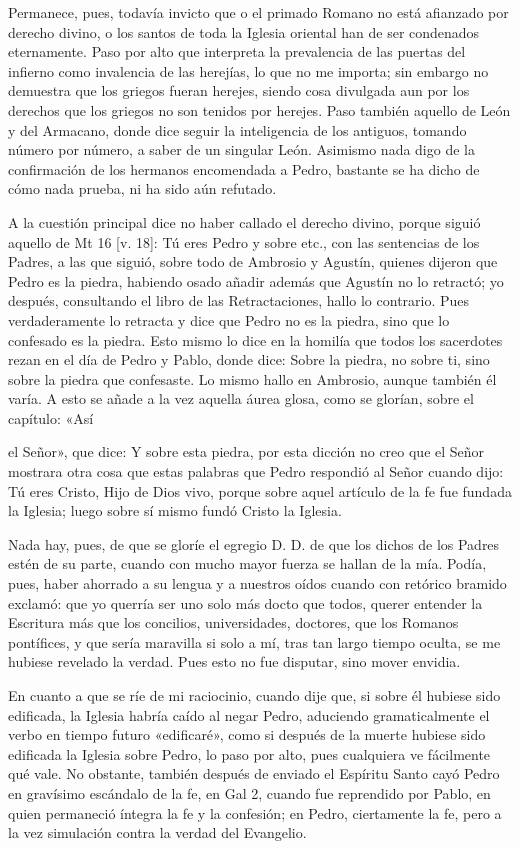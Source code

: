 Permanece, pues, todavía invicto que o el primado Romano no está afianzado por derecho divino, o los santos de toda la Iglesia oriental han de ser condenados eternamente. Paso por alto que interpreta la prevalencia de las puertas del infierno como invalencia de las herejías, lo que no me importa; sin embargo no demuestra que los griegos fueran herejes, siendo cosa divulgada aun por los derechos que los griegos no son tenidos por herejes. Paso también aquello de León y del Armacano, donde dice seguir la inteligencia de los antiguos, tomando número por número, a saber de un singular León. Asimismo nada digo de la confirmación de los hermanos encomendada a Pedro, bastante se ha dicho de cómo nada prueba, ni ha sido aún refutado.

A la cuestión principal dice no haber callado el derecho divino, porque siguió aquello de Mt 16 [v. 18]: Tú eres Pedro y sobre etc., con las sentencias de los Padres, a las que siguió, sobre todo de Ambrosio y Agustín, quienes dijeron que Pedro es la piedra, habiendo osado añadir además que Agustín no lo retractó; yo después, consultando el libro de las Retractaciones, hallo lo contrario. Pues verdaderamente lo retracta y dice que Pedro no es la piedra, sino que lo confesado es la piedra. Esto mismo lo dice en la homilía que todos los sacerdotes rezan en el día de Pedro y Pablo, donde dice: Sobre la piedra, no sobre ti, sino sobre la piedra que confesaste. Lo mismo hallo en Ambrosio, aunque también él varía. A esto se añade a la vez aquella áurea glosa, como se glorían, sobre el capítulo: «Así

el Señor», que dice: Y sobre esta piedra, por esta dicción no creo que el Señor mostrara otra cosa que estas palabras que Pedro respondió al Señor cuando dijo: Tú eres Cristo, Hijo de Dios vivo, porque sobre aquel artículo de la fe fue fundada la Iglesia; luego sobre sí mismo fundó Cristo la Iglesia.

Nada hay, pues, de que se gloríe el egregio D. D. de que los dichos de los Padres estén de su parte, cuando con mucho mayor fuerza se hallan de la mía. Podía, pues, haber ahorrado a su lengua y a nuestros oídos cuando con retórico bramido exclamó: que yo querría ser uno solo más docto que todos, querer entender la Escritura más que los concilios, universidades, doctores, que los Romanos pontífices, y que sería maravilla si solo a mí, tras tan largo tiempo oculta, se me hubiese revelado la verdad. Pues esto no fue disputar, sino mover envidia.

En cuanto a que se ríe de mi raciocinio, cuando dije que, si sobre él hubiese sido edificada, la Iglesia habría caído al negar Pedro, aduciendo gramaticalmente el verbo en tiempo futuro «edificaré», como si después de la muerte hubiese sido edificada la Iglesia sobre Pedro, lo paso por alto, pues cualquiera ve fácilmente qué vale. No obstante, también después de enviado el Espíritu Santo cayó Pedro en gravísimo escándalo de la fe, en Gal 2, cuando fue reprendido por Pablo, en quien permaneció íntegra la fe y la confesión; en Pedro, ciertamente la fe, pero a la vez simulación contra la verdad del Evangelio.

